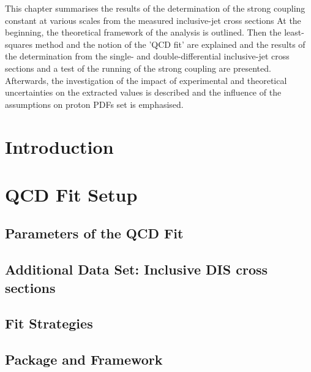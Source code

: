 This chapter summarises the results of the determination of the strong coupling constant at various scales from the measured inclusive-jet cross sections
At the beginning, the theoretical framework of the analysis is outlined. Then the least-squares method and the notion of the 'QCD fit' are explained and the results of the \asz determination from the single- and double-differential inclusive-jet cross sections and a test of the running of the strong coupling are presented. Afterwards, the investigation of the impact of experimental and theoretical uncertainties on the extracted \asz values is described and the influence of the assumptions on proton PDFs set is emphasised. %

\section{Introduction}
\label{sec:qcdfitintro}


\section{QCD Fit Setup}
\label{sec:fitsettings}


\subsection{Parameters of the QCD Fit}
\label{subsec:qcdfitparams}


\subsection{Additional Data Set: Inclusive DIS cross sections}
\label{subsec:inclusivedisdata}


\subsection{Fit Strategies}
\label{subsec:fitstategy}


\subsection{\herafitter Package and \fastnlo Framework}
\label{subsec:herfitter}


